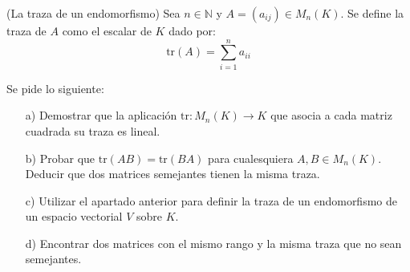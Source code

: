 \begin{ejercicio}
(La traza de un endomorfismo) Sea $n \in \mathbb{N}$ y $A = (a_{ij}) \in M_n(K)$. Se define la traza de $A$ como el escalar de $K$ dado por:
$$\text{tr}(A) = \sum_{i=1}^n a_{ii}$$

Se pide lo siguiente:
\begin{itemize}
    \item[a)] Demostrar que la aplicación $\text{tr}: M_n(K) \rightarrow K$ que asocia a cada matriz cuadrada su traza es lineal. 
    \item[b)] Probar que $\text{tr}(AB) = \text{tr}(BA)$ para cualesquiera $A, B \in M_n(K)$. Deducir que dos matrices semejantes tienen la misma traza.
    \item[c)] Utilizar el apartado anterior para definir la traza de un endomorfismo de un espacio vectorial $V$ sobre $K$.
    \item[d)] Encontrar dos matrices con el mismo rango y la misma traza que no sean semejantes.
\end{itemize}
\end{ejercicio}   





\newpage
